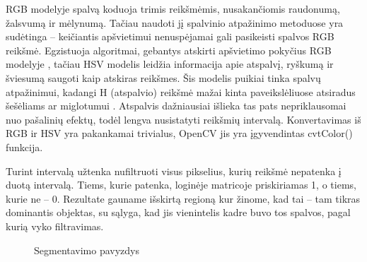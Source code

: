 \documentclass{VUMIFPSbakalaurinis}
\begin{document}
RGB modelyje spalvą koduoja trimis reikšmėmis, nusakančiomis raudonumą, žalsvumą ir mėlynumą. Tačiau naudoti jį spalvinio atpažinimo metoduose yra sudėtinga – keičiantis apšvietimui nenuspėjamai gali pasikeisti spalvos RGB reikšmė. Egzistuoja algoritmai, gebantys atskirti apšvietimo pokyčius RGB modelyje \cite{1220504}, tačiau HSV modelis leidžia informacija apie atspalvį, ryškumą ir šviesumą saugoti kaip atskiras reikšmes. Šis modelis puikiai tinka spalvų atpažinimui, kadangi H (atspalvio) reikšmė mažai kinta paveikslėliuose atsiradus šešėliams \cite{1039893} ar miglotumui \cite{7457892}. Atspalvis dažniausiai išlieka tas pats nepriklausomai nuo pašalinių efektų, todėl lengva nusistatyti reikšmių intervalą. Konvertavimas iš RGB ir HSV yra pakankamai trivialus, OpenCV jis yra įgyvendintas cvtColor() funkcija. 

Turint intervalą užtenka nufiltruoti visus pikselius, kurių reikšmė nepatenka į duotą intervalą. Tiems, kurie patenka, loginėje matricoje priskiriamas 1, o tiems, kurie ne – 0. Rezultate gauname išskirtą regioną kur žinome, kad tai – tam tikras dominantis objektas, su sąlyga, kad jis vienintelis kadre buvo tos spalvos, pagal kurią vyko filtravimas. 
\begin{figure}[H]
	\centering
	\qquad
	\caption{Segmentavimo pavyzdys}
	\label{fig:example}
\end{figure}
\end{document}
